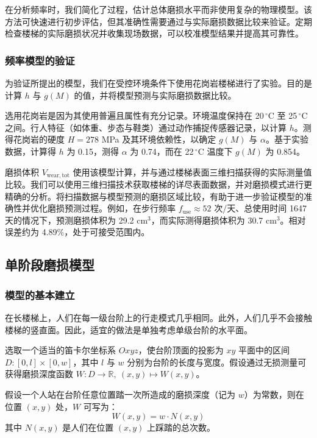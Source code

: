 \documentclass[11pt,a4paper]{ctexart}
\begin{document}
在分析频率时，我们简化了过程，估计总体磨损水平而非使用复杂的物理模型。该方法可快速进行初步评估，但其准确性需要通过与实际磨损数据比较来验证。定期检查楼梯的实际磨损状况并收集现场数据，可以校准模型结果并提高其可靠性。

\subsubsection{频率模型的验证}

为验证所提出的模型，我们在受控环境条件下使用花岗岩楼梯进行了实验。目的是计算 $h$ 与 $g(M)$ 的值，并将模型预测与实际磨损数据比较。

选用花岗岩是因为其使用普遍且属性有充分记录。环境温度保持在 20\,$^\circ$C 至 25\,$^\circ$C 之间。行人特征（如体重、步态与鞋类）通过动作捕捉传感器记录，以计算 $h$。测得花岗岩的硬度 $H = 278$ MPa 及其环境依赖性，以确定 $g(M)$ 与 $\alpha$。基于实验数据，计算得 $h$ 为 0.15，测得 $\alpha$ 为 0.74，而在 22\,$^\circ$C 温度下 $g(M)$ 为 0.854。

磨损体积 $V_{\mathrm{wear,tot}}$ 使用该模型计算，并与通过楼梯表面三维扫描获得的实际测量值比较。我们可以使用三维扫描技术获取楼梯的详尽表面数据，并对磨损模式进行更精确的分析。将扫描数据与模型预测的磨损区域比较，有助于进一步验证模型的准确性并优化磨损预测过程。例如，在步行频率 $f_{\mathrm{use}} \approx 52$ 次/天、总使用时间 1647 天的情况下，预测磨损体积为 29.2 cm$^3$，而实际测得磨损体积为 30.7 cm$^3$。相对误差约为 4.89\%，处于可接受范围内。

\subsection{单阶段磨损模型}

\subsubsection{模型的基本建立}

在长楼梯上，人们在每一级台阶上的行走模式几乎相同。此外，人们几乎不会接触楼梯的竖直面。因此，适宜的做法是单独考虑单级台阶的水平面。

选取一个适当的笛卡尔坐标系 $Oxyz$，使台阶顶面的投影为 $xy$ 平面中的区间 $D:[0,l]\times[0,w]$，其中 $l$ 与 $w$ 分别为台阶的长度与宽度。假设通过无损测量可获得磨损深度函数 $W:D\to\mathbb{R},\ (x,y)\mapsto W(x,y)$。

假设一个人站在台阶任意位置踏一次所造成的磨损深度（记为 $w$）为常数，则在位置 $(x,y)$ 处，$W$ 可写为：
\begin{equation}
W(x,y) = w\cdot N(x,y)
\end{equation}
其中 $N(x,y)$ 是人们在位置 $(x,y)$ 上踩踏的总次数。
\end{document}
